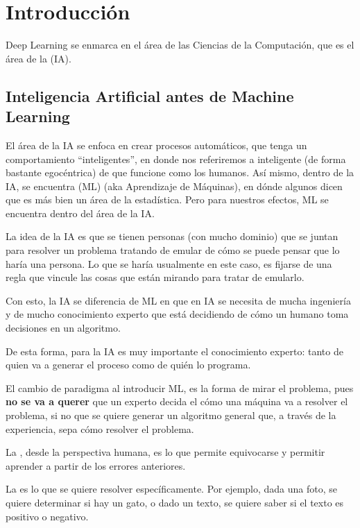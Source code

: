 \chapter{Introducción}

Deep Learning se enmarca en el área de las Ciencias de la Computación, que es el área de la  (IA).

\section{Inteligencia Artificial antes de Machine Learning}
El área de la IA se enfoca en crear procesos automáticos, que tenga un comportamiento ``inteligentes'', en donde nos referiremos a inteligente (de forma bastante egocéntrica) de que funcione como los humanos. Así mismo, dentro de la IA, se encuentra  (ML) (aka Aprendizaje de Máquinas), en dónde algunos dicen que es más bien un área de la estadística. Pero para nuestros efectos, ML se encuentra dentro del área de la IA.


La idea de la IA es que se tienen personas (con mucho dominio) que se juntan para resolver un problema tratando de emular de cómo se puede pensar que lo haría una persona. Lo que se haría usualmente en este caso, es fijarse de una regla que vincule las cosas que están mirando para tratar de emularlo. 

Con esto, la IA se diferencia de ML en que en IA se necesita de mucha ingeniería y de mucho conocimiento experto que está decidiendo de cómo un humano toma decisiones en un algoritmo.

De esta forma, para la IA es muy importante el conocimiento experto: tanto de quien va a generar el proceso como de quién lo programa. 

El cambio de paradigma al introducir ML, es la forma de mirar el problema, pues \textbf{no se va a querer} que un experto decida el cómo una máquina va a resolver el problema, si no que se quiere generar un algoritmo general que, a través de la experiencia, sepa cómo resolver el problema.


La , desde la perspectiva humana, es lo que permite equivocarse y permitir aprender a partir de los errores anteriores. 

La  es lo que se quiere resolver específicamente. Por ejemplo, dada una foto, se quiere determinar si hay un gato, o dado un texto, se quiere saber si el texto es positivo o negativo.

